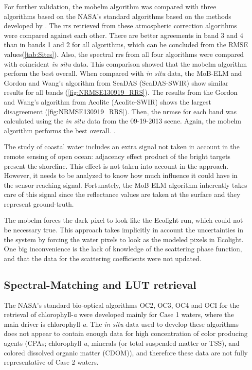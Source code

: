 For further validation, the \gls{mobelm} algorithm was compared with three algorithms based on the NASA's standard algorithms based on the methods developed by \cite{Gordon:1994}. The \gls{rrs} retrieved from these atmospheric correction algorithms were compared against each other. There are better agreements in band 3 and 4 than in bands 1 and 2 for all algorithms, which can be concluded from the RMSE values(\autoref{tab:Sites}). Also, the spectral \gls{rrs} from all four algorithms were compared with coincident {\it in situ} data. This comparison showed that the \gls{mobelm} algorithm perform the best overall.  When compared with {\it in situ} data, the MoB-ELM and Gordon and Wang's algorithm from SeaDAS (SeaDAS-SWIR) show similar results for all bands (\autoref{fig:NRMSE130919_RRS}). The results from the Gordon and Wang's algorithm from Acolite (Acolite-SWIR) shows the largest disagreement (\autoref{fig:NRMSE130919_RRS}). Then, the \gls{nrmse} for each band was calculated using the {\it in situ} data from the 09-19-2013 scene. Again, the \gls{mobelm} algorithm performs the best overall. .

The study of coastal water includes an extra signal not taken in account in the remote sensing of open ocean: adjacency effect product of the bright targets present the shoreline. This effect is not taken into account in the \cite{Gordon:1994} approach. However, it needs to be analyzed to know how much influence it could have in the sensor-reaching signal. Fortunately, the MoB-ELM algorithm inherently takes care of this signal since the reflectance values are taken at the surface and they represent ground-truth.

The \gls{mobelm} forces the dark pixel to look like the Ecolight run, which could not be necessary true. This approach takes implicitly in account the uncertainties in the system by forcing the water pixels to look as the modeled pixels in Ecolight. One big inconvenience is the lack of knowledge of the scattering phase function, and that the data for the scattering coefficients were not updated.

\subsection{Spectral-Matching and LUT retrieval}
The NASA's standard bio-optical algorithms OC2, OC3, OC4 \cite{OReilly2000} and OCI \cite{Hu:2012} for the retrieval of chlorophyll-{\it a} were developed mainly for Case 1 waters, where the main driver is chlorophyll-{\it a}. The {\it in situ} data used to develop these algorithms does not appear to contain enough data for high concentration of color producing agents (CPAs; chlorophyll-{\it a}, minerals (or total suspended matter or TSS), and colored dissolved organic matter (CDOM)), and therefore these data are not fully representative of Case 2 waters. 

